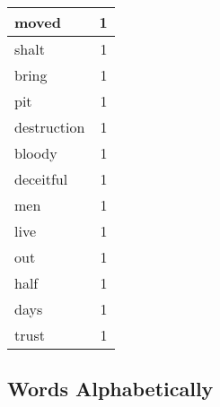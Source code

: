 \begin{center}
\begin{longtable}{l|r}
moved & 1 \\ \hline
shalt & 1 \\ \hline
bring & 1 \\ \hline
pit & 1 \\ \hline
destruction & 1 \\ \hline
bloody & 1 \\ \hline
deceitful & 1 \\ \hline
men & 1 \\ \hline
live & 1 \\ \hline
out & 1 \\ \hline
half & 1 \\ \hline
days & 1 \\ \hline
trust & 1 \\ \hline
\end{longtable}
\end{center}



\normalsize



\subsection{Words Alphabetically}

